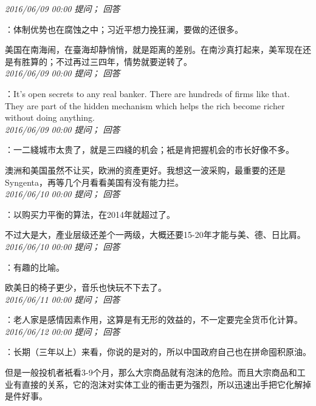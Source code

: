\documentclass[twocolumn]{ctexart}
\begin{document}
\textit{\hfill\noindent\small 2016/06/09 00:00 提问； 回答}

：体制优势也在腐蚀之中；习近平想力挽狂澜，要做的还很多。

美国在南海闹，在臺海却静悄悄，就是距离的差别。在南沙真打起来，美军现在还是有胜算的；不过再过三四年，情势就要逆转了。\\

\textit{\hfill\noindent\small 2016/06/09 00:00 提问； 回答}

：It's open secrets to any real banker. There are hundreds of firms like that. They are part of the hidden mechanism which helps the rich become richer without doing anything.\\

\textit{\hfill\noindent\small 2016/06/09 00:00 提问； 回答}

：一二綫城市太贵了，就是三四綫的机会；衹是肯把握机会的市长好像不多。

澳洲和美国虽然不让买，欧洲的资產更好。我想这一波采购，最重要的还是Syngenta，再等几个月看看美国有没有能力拦。\\

\textit{\hfill\noindent\small 2016/06/10 00:00 提问； 回答}

：以购买力平衡的算法，在2014年就超过了。

不过大是大，產业层级还差个一两级，大概还要15-20年才能与美、德、日比肩。\\

\textit{\hfill\noindent\small 2016/06/10 00:00 提问； 回答}

：有趣的比喻。

欧美日的椅子更少，音乐也快玩不下去了。\\

\textit{\hfill\noindent\small 2016/06/11 00:00 提问； 回答}

：老人家是感情因素作用，这算是有无形的效益的，不一定要完全货币化计算。\\

\textit{\hfill\noindent\small 2016/06/12 00:00 提问； 回答}

：长期（三年以上）来看，你说的是对的，所以中国政府自己也在拼命囤积原油。

但是一般投机者衹看3-9个月，那么大宗商品就有泡沫的危险。而且大宗商品和工业有直接的关系，它的泡沫对实体工业的衝击更为强烈，所以迅速出手把它化解掉是件好事。\\
\end{document}
